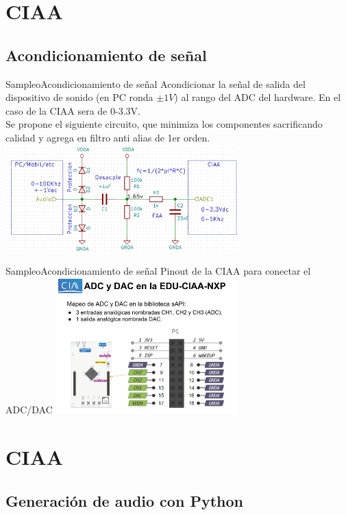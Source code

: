  \section{CIAA}
 \subsection{Acondicionamiento de señal}
 \begin{frame}[t]{Sampleo}{Acondicionamiento de señal}
    Acondicionar la señal de salida del dispositivo de sonido (en PC ronda $\pm1V$) al rango del ADC del hardware. En el caso de la CIAA sera de 0-3.3V. \\ 
    Se propone el siguiente circuito, que minimiza los componentes sacrificando calidad y agrega en filtro anti alias de 1er orden.
    \protoboardicon
    \center\includegraphics[width=9cm]{2_clase/circuito}
    \vfill
 \end{frame}
 \begin{frame}{Sampleo}{Acondicionamiento de señal}
    Pinout de la CIAA para conectar el ADC/DAC
    \protoboardicon
    \center\includegraphics[width=7cm]{2_clase/adc_dac_pins}
    \vfill
 \end{frame}
 \section{CIAA}
 \subsection{Generación de audio con Python}
    
